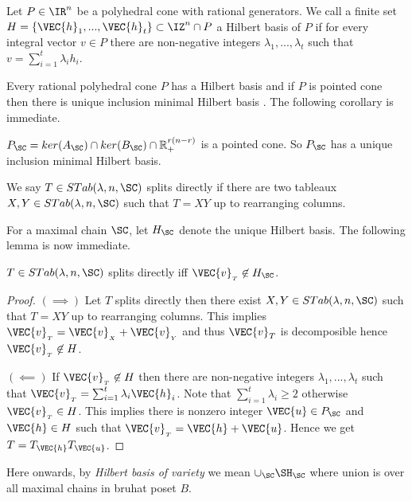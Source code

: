 \begin{definition}
    Let \(P \in \IR^n\) be a polyhedral cone with rational generators. 
    We call a finite set \(H = \{\VEC{h}_1,...,\VEC{h}_t\} \subset \IZ^n \cap P\) 
    a Hilbert basis of $P$ if for every integral vector $v \in P$ 
    there are non-negative integers \(\lambda_1,...,\lambda_t\) such that 
    $v=\sum_{i=1}^t \lambda_i h_i.$ 
   \end{definition} 
   
Every rational polyhedral cone $P$ has a Hilbert basis and if $P$  is pointed cone 
then there is unique inclusion minimal Hilbert basis \cite[Theorem 16.4]{schrijver1998theory}.
The following corollary is immediate.

\begin{corollary}
    $P_{\SC} = ker(A_{\SC}) \cap ker(B_{\SC}) \cap {\mathbb R}^{r(n-r)}_+$ is a pointed cone. 
    So $P_{\SC}$ has a unique inclusion minimal Hilbert basis.
\end{corollary}
 

\begin{definition}
    We say \(T \in STab(\lambda,n,\SC)\) splits directly 
    if there are two tableaux \(X,Y \in STab(\lambda,n,\SC)\) such that \(T=XY\) up to rearranging columns.
\end{definition}

For a maximal chain $\SC$, let $H_{\SC}$ denote the unique Hilbert basis. The following lemma is now immediate.
\begin{lemma}
    \(T \in STab(\lambda,n,\SC)\) splits directly iff \(\VEC{v}_{_T} \not\in H_{\SC}\). 
\end{lemma}
\begin{proof}
    \((\implies)\)
    Let \(T\) splits directly then there exist \(X,Y \in STab(\lambda,n,\SC)\) such that 
    \(T = XY\) up to rearranging columns. 
    This implies \(\VEC{v}_{_T} = \VEC{v}_{_X} + \VEC{v}_{_Y}\) 
    and thus \(\VEC{v}_{T}\) is decomposible hence \(\VEC{v}_{_T} \not\in H\).

    \((\impliedby)\) If \(\VEC{v}_{_T} \not\in H\) then there are non-negative integers 
    \(\lambda_1,...,\lambda_t\) such that \(\VEC{v}_{_T} = \sum_{i=1}^t \lambda_i \VEC{h}_i\). 
    Note that \(\sum_{i=1}^t \lambda_i \ge 2\) otherwise \(\VEC{v}_{_T} \in H\). 
    This implies there is nonzero integer \(\VEC{u} \in P_{\SC} \) and \(\VEC{h} \in H\) 
    such that \(\VEC{v}_{_T} = \VEC{h} + \VEC{u}\). 
    Hence we get \(T=T_{\VEC{h}}T_{\VEC{u}}\).     
\end{proof}
Here onwards, by {\em Hilbert basis of variety} we mean \(\cup_{\SC} \SH_{\SC}\) where union is over all maximal chains in bruhat poset \(B\).


